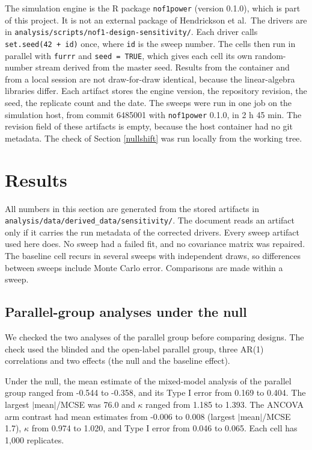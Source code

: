 \documentclass[
  11pt,
]{article}
\begin{document}
The simulation engine is the R package \texttt{nof1power} (version 0.1.0), which is part of this project. It is not an external package of Hendrickson et al.~The drivers are in \texttt{analysis/scripts/nof1-design-sensitivity/}. Each driver calls \texttt{set.seed(42\ +\ id)} once, where \texttt{id} is the sweep number. The cells then run in parallel with \texttt{furrr} and \texttt{seed\ =\ TRUE}, which gives each cell its own random-number stream derived from the master seed. Results from the container and from a local session are not draw-for-draw identical, because the linear-algebra libraries differ. Each artifact stores the engine version, the repository revision, the seed, the replicate count and the date. The sweeps were run in one job on the simulation host, from commit 6485001 with \texttt{nof1power} 0.1.0, in 2 h 45 min. The revision field of these artifacts is empty, because the host container had no git metadata. The check of Section \ref{nullshift} was run locally from the working tree.

\section{Results}\label{results}

All numbers in this section are generated from the stored artifacts in \texttt{analysis/data/derived\_data/sensitivity/}. The document reads an artifact only if it carries the run metadata of the corrected drivers. Every sweep artifact used here does. No sweep had a failed fit, and no covariance matrix was repaired. The baseline cell recurs in several sweeps with independent draws, so differences between sweeps include Monte Carlo error. Comparisons are made within a sweep.

\subsection{Parallel-group analyses under the null}\label{rctcheck}

We checked the two analyses of the parallel group before comparing designs. The check used the blinded and the open-label parallel group, three AR(1) correlations and two effects (the null and the baseline effect).

Under the null, the mean estimate of the mixed-model analysis of the parallel group ranged from -0.544 to -0.358, and its Type I error from 0.169 to 0.404. The largest \(|\)mean\(|\)/MCSE was 76.0 and \(\kappa\) ranged from 1.185 to 1.393. The ANCOVA arm contrast had mean estimates from -0.006 to 0.008 (largest \(|\)mean\(|\)/MCSE 1.7), \(\kappa\) from 0.974 to 1.020, and Type I error from 0.046 to 0.065. Each cell has 1,000 replicates.
\end{document}
